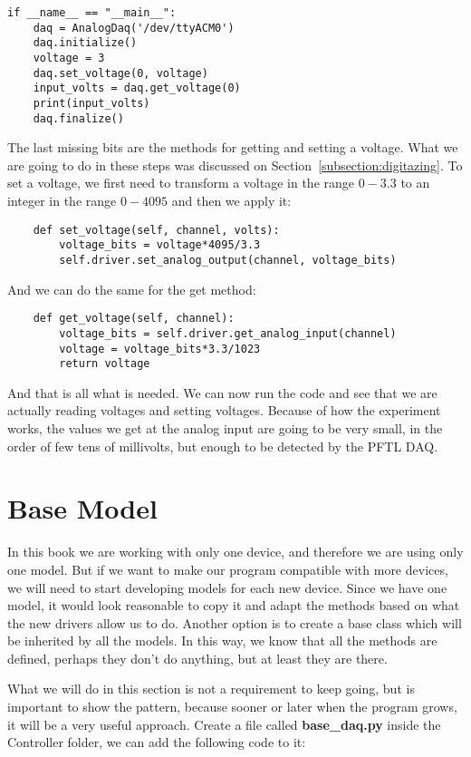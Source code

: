 \begin{verbatim}
if __name__ == "__main__":
    daq = AnalogDaq('/dev/ttyACM0')
    daq.initialize()
    voltage = 3
    daq.set_voltage(0, voltage)
    input_volts = daq.get_voltage(0)
    print(input_volts)
    daq.finalize()
\end{verbatim}

The last missing bits are the methods for getting and setting a voltage. What we are going to do in these steps was discussed on Section~\ref{subsection:digitazing}. To set a voltage, we first need to transform a voltage in the range $0-3.3$ to an integer in the range $0-4095$ and then we apply it:

\begin{verbatim}
    def set_voltage(self, channel, volts):
        voltage_bits = voltage*4095/3.3
        self.driver.set_analog_output(channel, voltage_bits)
\end{verbatim}

And we can do the same for the get method:

\begin{verbatim}
    def get_voltage(self, channel):
        voltage_bits = self.driver.get_analog_input(channel)
        voltage = voltage_bits*3.3/1023
        return voltage
\end{verbatim}

And that is all what is needed. We can now run the code and see that we are actually reading voltages and setting voltages. Because of how the experiment works, the values we get at the analog input are going to be very small, in the order of few tens of millivolts, but enough to be detected by the {PFTL DAQ}.

\section{Base Model}\label{sec:base-model}
In this book we are working with only one device, and therefore we are using only one model. But if we want to make our program compatible with more devices, we will need to start developing models for each new device. Since we have one model, it would look reasonable to copy it and adapt the methods based on what the new drivers allow us to do. Another option is to create a base class which will be inherited by all the models. In this way, we know that all the methods are defined, perhaps they don't do anything, but at least they are there.

What we will do in this section is not a requirement to keep going, but is important to show the pattern, because sooner or later when the program grows, it will be a very useful approach. Create a file called \textbf{base\_daq.py} inside the Controller folder, we can add the following code to it:

